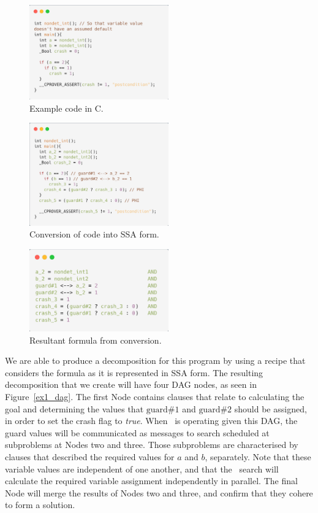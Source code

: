 \documentclass[
10pt, %
a4paper, %
oneside, %
headinclude,footinclude, %
BCOR5mm, %
]{scrartcl}
\begin{document}
\begin{figure}[h]
  \centering
  \includegraphics[width=6cm]{./figs/ex1_code.png}
  \caption{Example code in C.}
  \label{ex1_code}
\end{figure}
\begin{figure}[h]
  \centering
  \includegraphics[width=6cm]{./figs/ex1_ssa.png}
  \caption{Conversion of code into SSA form.}
  \label{ex1_ssa}
\end{figure}
\begin{figure}[h]
  \centering
  \includegraphics[width=6cm]{./figs/ex1_formula.png}
  \caption{Resultant formula from conversion.}
  \label{ex1_formula}
\end{figure}

We are able to produce a decomposition for this program by using a recipe that considers the formula as it is represented in SSA form. The resulting decomposition that we create will have four DAG nodes, as seen in Figure~\ref{ex1_dag}.
The first Node contains clauses that relate to calculating the goal and determining the values that $\mbox{guard}\#1$ and $\mbox{guard}\#2$ should be assigned, in order to set the crash flag to {\em true}.
When \dagster\ is operating given this DAG, the guard values will be communicated as messages to search scheduled at subproblems at Nodes two and three.
Those subproblems are characterised by clauses that described the required values for $a$ and $b$, separately. Note that these variable values are independent of one another, and that the \dagster\ search will calculate the required variable assignment independently in parallel.
The final Node will merge the results of Nodes two and three, and confirm that they cohere to form a solution.
\end{document}
